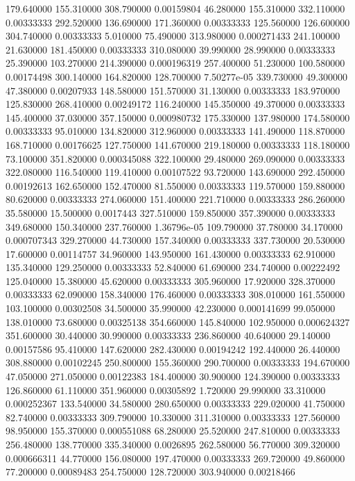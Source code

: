 179.640000	155.310000	308.790000	0.00159804
46.280000	155.310000	332.110000	0.00333333
292.520000	136.690000	171.360000	0.00333333
125.560000	126.600000	304.740000	0.00333333
5.010000	75.490000	313.980000	0.000271433
241.100000	21.630000	181.450000	0.00333333
310.080000	39.990000	28.990000	0.00333333
25.390000	103.270000	214.390000	0.000196319
257.400000	51.230000	100.580000	0.00174498
300.140000	164.820000	128.700000	7.50277e-05
339.730000	49.300000	47.380000	0.00207933
148.580000	151.570000	31.130000	0.00333333
183.970000	125.830000	268.410000	0.00249172
116.240000	145.350000	49.370000	0.00333333
145.400000	37.030000	357.150000	0.000980732
175.330000	137.980000	174.580000	0.00333333
95.010000	134.820000	312.960000	0.00333333
141.490000	118.870000	168.710000	0.00176625
127.750000	141.670000	219.180000	0.00333333
118.180000	73.100000	351.820000	0.000345088
322.100000	29.480000	269.090000	0.00333333
322.080000	116.540000	119.410000	0.00107522
93.720000	143.690000	292.450000	0.00192613
162.650000	152.470000	81.550000	0.00333333
119.570000	159.880000	80.620000	0.00333333
274.060000	151.400000	221.710000	0.00333333
286.260000	35.580000	15.500000	0.0017443
327.510000	159.850000	357.390000	0.00333333
349.680000	150.340000	237.760000	1.36796e-05
109.790000	37.780000	34.170000	0.000707343
329.270000	44.730000	157.340000	0.00333333
337.730000	20.530000	17.600000	0.00114757
34.960000	143.950000	161.430000	0.00333333
62.910000	135.340000	129.250000	0.00333333
52.840000	61.690000	234.740000	0.00222492
125.040000	15.380000	45.620000	0.00333333
305.960000	17.920000	328.370000	0.00333333
62.090000	158.340000	176.460000	0.00333333
308.010000	161.550000	103.100000	0.00302508
34.500000	35.990000	42.230000	0.000141699
99.050000	138.010000	73.680000	0.00325138
354.660000	145.840000	102.950000	0.000624327
351.600000	30.440000	30.990000	0.00333333
236.860000	40.640000	29.140000	0.00157586
95.410000	147.620000	282.430000	0.00194242
192.440000	26.440000	308.880000	0.00102245
250.800000	155.360000	290.700000	0.00333333
194.670000	47.050000	271.050000	0.00122383
184.400000	30.900000	124.390000	0.00333333
126.860000	61.110000	351.960000	0.00305892
1.720000	29.990000	33.310000	0.000252367
133.540000	34.580000	280.650000	0.00333333
229.020000	41.750000	82.740000	0.00333333
309.790000	10.330000	311.310000	0.00333333
127.560000	98.950000	155.370000	0.000551088
68.280000	25.520000	247.810000	0.00333333
256.480000	138.770000	335.340000	0.0026895
262.580000	56.770000	309.320000	0.000666311
44.770000	156.080000	197.470000	0.00333333
269.720000	49.860000	77.200000	0.00089483
254.750000	128.720000	303.940000	0.00218466

